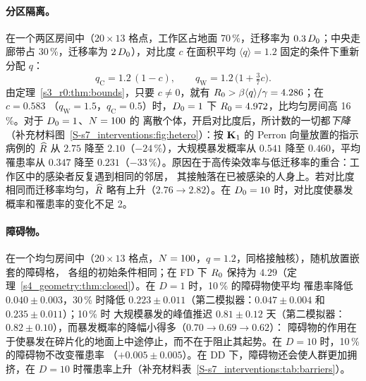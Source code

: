\paragraph{分区隔离。}在一个两区房间中（$20\times13$ 格点，工作区占地面 70\,\%，迁移率为 $0.3\,D_0$；中央走廊带占
30\,\%，迁移率为 $2\,D_0$），对比度 $c$ 在面积平均 $\langle q\rangle=1.2$ 固定的条件下重新分配 $q$：
\begin{equation}\label{s7_interventions:eq:contrast}
  q_{\mathrm C}=1.2\,(1-c),\qquad q_{\mathrm W}=1.2\,\bigl(1+\tfrac37c\bigr).
\end{equation}
由定理~\ref{s3_r0:thm:bounds}，只要 $c\ne0$，就有 $R_0>\beta\langle q\rangle/\gamma=4.286$；在 $c=0.583$
（$q_{\mathrm W}=1.5$，$q_{\mathrm C}=0.5$）时，$D_0=1$ 下 $R_0=4.972$，比均匀房间高 16\,\%。对于 $D_0=1$、$N=100$ 的
离散个体，开启对比度后，所计数的一切都\emph{下降}（补充材料图~\ref{S-s7_interventions:fig:hetero}）：按 $\mathbf{K}_1$
的 Perron 向量放置的指示病例的 $\widehat{R}$ 从 $2.75$ 降至 $2.10$（$-24\,\%$），大规模暴发概率从 $0.541$ 降至 $0.460$，平均
罹患率从 $0.347$ 降至 $0.231$（$-33\,\%$）。原因在于高传染效率与低迁移率的重合：工作区中的感染者反复遇到相同的邻居，
其接触落在已被感染的人身上。若对比度相同而迁移率均匀，$\widehat{R}$ 略有上升（$2.76\to2.82$）。在 $D_0=10$ 时，对比度使暴发
概率和罹患率的变化不足 2\pct。

\paragraph{障碍物。}在一个均匀房间中（$20\times13$ 格点，$N=100$，$q=1.2$，同格接触核），随机放置嵌套的障碍格，
各组的初始条件相同；在 FD 下 $R_0$ 保持为 $4.29$（定理~\ref{s4_geometry:thm:closed}）。在 $D=1$ 时，10\,\% 的障碍物使平均
罹患率降低 $0.040\pm0.003$，30\,\% 时降低 $0.223\pm0.011$（第二模拟器：$0.047\pm0.004$ 和 $0.235\pm0.011$）；10\,\% 时
大规模暴发的峰值推迟 $0.81\pm0.12$ 天（第二模拟器：$0.82\pm0.10$），而暴发概率的降幅小得多（$0.70\to0.69\to0.62$）：
障碍物的作用在于使暴发在碎片化的地面上中途停止，而不在于阻止其起势。在 $D=10$ 时，10\,\% 的障碍物不改变罹患率
（$+0.005\pm0.005$）。在 DD 下，障碍物还会使人群更加拥挤，在 $D=10$ 时罹患率上升（补充材料表~\ref{S-s7_interventions:tab:barriers}）。

